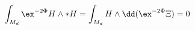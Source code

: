 \begin{equation}
   \int_{M_d} \ex^{-2\Phi}H\wedge *H 
      = \int_{M_d} H \wedge \dd(\ex^{-2\Phi} \Xi) = 0
\end{equation}

